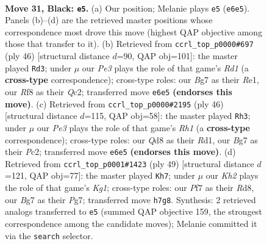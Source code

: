 \documentclass[11pt]{article}
\begin{document}
\clearpage

\begin{figure}[p]\centering
\begin{subfigure}{0.46\textwidth}\centering
\resizebox{\linewidth}{!}{%
\newchessgame
\chessboard[
  setfen={r1bq1r2/pp3pbk/n3pnp1/P2p2Bp/B2P2PP/1P6/R1PNQP2/1N2R1K1 b - - 0 31},
  showmover=false,
  pgfstyle=straightmove, color=movearrow, markmove={e6-e5}
]}
\caption{}
\end{subfigure}\hfill
\begin{subfigure}{0.46\textwidth}\centering
\resizebox{\linewidth}{!}{%
\newchessgame
\chessboard[
  setfen={1n1r2k1/1pp1nrp1/p4b1p/2BPp3/4Ppq1/PN4Pb/1PQ1NP1P/3RR1KB w - - 1 24},
  showmover=false,
  pgfstyle=straightmove, color=movearrow, markmove={d1-d3}
]}
\caption{}
\end{subfigure}
\\[4pt]
\begin{subfigure}{0.46\textwidth}\centering
\resizebox{\linewidth}{!}{%
\newchessgame
\chessboard[
  setfen={knr4r/1p4p1/pq2pp1p/2bpP2P/b2N1P2/1P2B1Q1/P1P1B1P1/1K1R3R w - - 3 24},
  showmover=false,
  pgfstyle=straightmove, color=movearrow, markmove={h1-h3}
]}
\caption{}
\end{subfigure}\hfill
\begin{subfigure}{0.46\textwidth}\centering
\resizebox{\linewidth}{!}{%
\newchessgame
\chessboard[
  setfen={3r2k1/3q1pp1/1pn1r1bp/p1pnp3/2Q1N3/PP1PPB1P/1B1R1PP1/2R3K1 b - - 7 25},
  showmover=false,
  pgfstyle=straightmove, color=movearrow, markmove={g8-h7}
]}
\caption{}
\end{subfigure}
\caption{\textbf{Move 31, Black: \texttt{e5}.} (a) Our position; Melanie plays \texttt{e5} (\texttt{e6e5}). Panels (b)--(d) are the retrieved master positions whose correspondence most drove this move (highest QAP objective among those that transfer to it). (b) Retrieved from \texttt{ccrl\_top\_p0000\#697} (ply 46) [structural distance $d$=90, QAP obj=101]: the master played \texttt{Rd3}; under $\mu$ our \emph{Pe3} plays the role of that game's \emph{Rd1} (a \textbf{cross-type} correspondence); cross-type roles: our \emph{B}g7 as their \emph{R}e1, our \emph{R}f8 as their \emph{Q}c2; transferred move \texttt{e6e5} \textbf{(endorses this move)}. (c) Retrieved from \texttt{ccrl\_top\_p0000\#2195} (ply 46) [structural distance $d$=115, QAP obj=58]: the master played \texttt{Rh3}; under $\mu$ our \emph{Pe3} plays the role of that game's \emph{Rh1} (a \textbf{cross-type} correspondence); cross-type roles: our \emph{Q}d8 as their \emph{R}d1, our \emph{B}g7 as their \emph{P}c2; transferred move \texttt{e6e5} \textbf{(endorses this move)}. (d) Retrieved from \texttt{ccrl\_top\_p0001\#1423} (ply 49) [structural distance $d$=121, QAP obj=77]: the master played \texttt{Kh7}; under $\mu$ our \emph{Kh2} plays the role of that game's \emph{Kg1}; cross-type roles: our \emph{P}f7 as their \emph{R}d8, our \emph{B}g7 as their \emph{P}g7; transferred move \texttt{h7g8}. Synthesis: 2 retrieved analogs transferred to \texttt{e5} (summed QAP objective 159, the strongest correspondence among the candidate moves); Melanie committed it via the \texttt{search} selector.}
\label{fig:thought-m61}
\end{figure}
\end{document}
